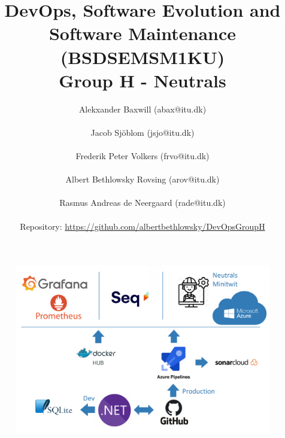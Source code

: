 \documentclass{article}
\begin{document}
\title{%
  DevOps, Software Evolution and Software Maintenance (BSDSEMSM1KU) \\
  \large Group H - Neutrals}

\author{Alekxander Baxwill (abax@itu.dk)\\ \\ Jacob Sjöblom (jsjo@itu.dk) \\ \\ Frederik Peter Volkers (frvo@itu.dk) \\ \\ Albert Bethlowsky Rovsing (arov@itu.dk) \\ \\ Rasmus Andreas de Neergaard (rade@itu.dk) \\ \\ Repository: \url{https://github.com/albertbethlowsky/DevOpsGroupH}} 



\maketitle

  
\begin{figure}[H]
\centering
\includegraphics[width=1\textwidth]{images/SystemDesign.png}
\end{figure}
\newpage

\tableofcontents
\newpage

\newpage
\end{document}
